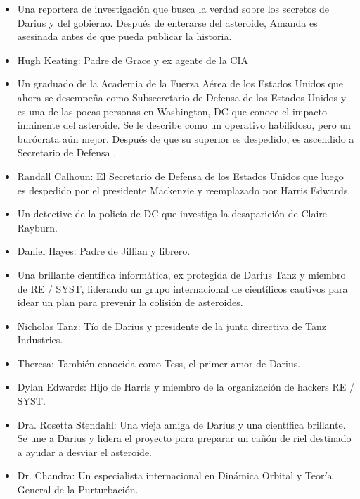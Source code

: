 \documentclass[a5paper,11pt]{article}
\begin{document}
{\begin{itemize}
     \item[\Plane] Una reportera de investigación que busca la verdad sobre los secretos de Darius y del gobierno. Después de enterarse del asteroide, Amanda es asesinada antes de que pueda publicar la historia.
     \item[\Plane] Hugh Keating: Padre de Grace y ex agente de la CIA
     \item[\Plane] Un graduado de la Academia de la Fuerza Aérea de los Estados Unidos que ahora se desempeña como Subsecretario de Defensa de los Estados Unidos y es una de las pocas personas en Washington, DC que conoce el impacto inminente del asteroide. Se le describe como un operativo habilidoso, pero un burócrata aún mejor. Después de que su superior es despedido, es ascendido a Secretario de Defensa .
     \item[\Plane] Randall Calhoun: El Secretario de Defensa de los Estados Unidos que luego es despedido por el presidente Mackenzie y reemplazado por Harris Edwards.
     \item[\Plane] Un detective de la policía de DC que investiga la desaparición de Claire Rayburn.
     \item[\Plane] Daniel Hayes: Padre de Jillian y librero.
     \item[\Plane] Una brillante científica informática, ex protegida de Darius Tanz y miembro de RE / SYST, liderando un grupo internacional de científicos cautivos para idear un plan para prevenir la colisión de asteroides.
     \item[\Plane] Nicholas Tanz: Tío de Darius y presidente de la junta directiva de Tanz Industries.
     \item[\Plane] Theresa: También conocida como Tess, el primer amor de Darius.
     \item[\Plane] Dylan Edwards: Hijo de Harris y miembro de la organización de hackers RE / SYST.
     \item[\Plane]  Dra. Rosetta Stendahl: Una vieja amiga de Darius y una científica brillante. Se une a Darius y lidera el proyecto para preparar un cañón de riel destinado a ayudar a desviar el asteroide.
     \item[\Plane] Dr. Chandra: Un especialista internacional en Dinámica Orbital y Teoría General de la Purturbación.
    
\end{itemize}

    }
\end{document}
